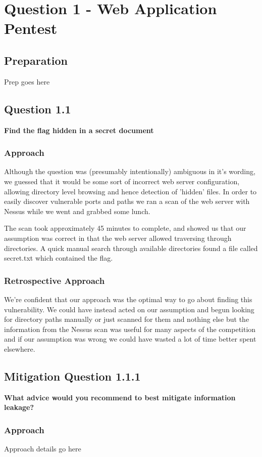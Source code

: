 \chapter{Question 1 - Web Application Pentest}

\section{Preparation}
Prep goes here

\section{Question 1.1}
\textbf{Find the flag hidden in a secret document}
\subsection{Approach}
Although the question was (presumably intentionally) ambiguous in it's wording,
we guessed that it would be some sort of incorrect web server configuration,
allowing directory level browsing and hence detection of 'hidden' files. In
order to easily discover vulnerable ports and paths we ran a scan of the web
server with Nessus while we went and grabbed some lunch.

The scan took approximately 45 minutes to complete, and showed us that our
assumption was correct in that the web server allowed traversing through
directories. A quick manual search through available directories found a file
called secret.txt which contained the flag.
\subsection{Retrospective Approach}
We're confident that our approach was the optimal way to go about finding this
vulnerability. We could have instead acted on our assumption and begun looking
for directory paths manually or just scanned for them and nothing else but the
information from the Nessus scan was useful for many aspects of the competition
and if our assumption was wrong we could have wasted a lot of time better spent
elsewhere.

\section{Mitigation Question 1.1.1}
\textbf{What advice would you recommend to best mitigate information leakage?}
\subsection{Approach}
Approach details go here

